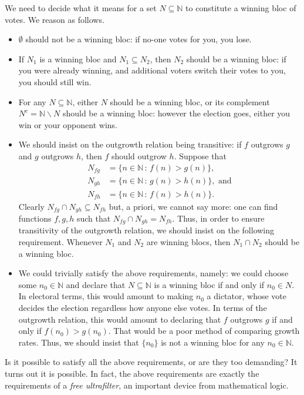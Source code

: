 \documentclass[twoside,11pt]{article}
\begin{document}
We need to decide what it means for a set $N\subseteq \mathbb N$ to constitute a winning
bloc of votes. We reason as follows.
\begin{itemize}
    \item $\emptyset$ should not be a winning bloc: if no-one votes for
    you, you lose.
    \item If $N_1$ is a winning bloc and $N_1\subseteq N_2$, then $N_2$ should
    be a winning bloc: if you were already winning, and additional voters switch
    their votes to you, you should still win.
    \item For any $N\subseteq \mathbb N$, either $N$ should be a winning bloc,
    or its complement $N^c=\mathbb N\backslash N$ should be a winning bloc:
    however the election goes, either you win or your opponent wins.
    \item We should insist on the outgrowth relation being transitive:
    if $f$ outgrows $g$ and $g$ outgrows $h$, then $f$ should outgrow $h$.
    Suppose that
    \begin{align*}
        N_{fg} &= \{ n\in\mathbb N \,:\, f(n)>g(n)\},\\
        N_{gh} &= \{ n\in\mathbb N \,:\, g(n)>h(n)\},\mbox{ and}\\
        N_{fh} &= \{ n\in\mathbb N \,:\, f(n)>h(n)\}.
    \end{align*}
    Clearly $N_{fg}\cap N_{gh}\subseteq N_{fh}$ but, a priori, we cannot say
    more: one can find functions $f,g,h$ such that
    $N_{fg}\cap N_{gh}=N_{fh}$. Thus, in order to ensure transitivity of the
    outgrowth relation, we should insist on the following requirement.
    Whenever $N_1$ and $N_2$ are winning blocs, then $N_1\cap N_2$ should be a winning bloc.
    \item We could trivially satisfy the
    above requirements, namely: we could choose some $n_0\in\mathbb N$ and
    declare that $N\subseteq \mathbb N$ is a winning bloc if and only if
    $n_0\in N$. In electoral terms, this would amount to making $n_0$ a dictator, whose
    vote decides the election regardless how anyone else votes. In terms of
    the outgrowth relation, this would amount to declaring that $f$ outgrows $g$
    if and only if $f(n_0)>g(n_0)$. That would be a poor method
    of comparing growth rates. Thus, we should insist that $\{n_0\}$ is not a winning
    bloc for any $n_0\in\mathbb N$.
\end{itemize}
Is it possible to satisfy all the above requirements, or are they too demanding?
It turns out it is possible. In fact, the above requirements are exactly the requirements
of a \emph{free ultrafilter}, an important device from mathematical logic.
\end{document}
